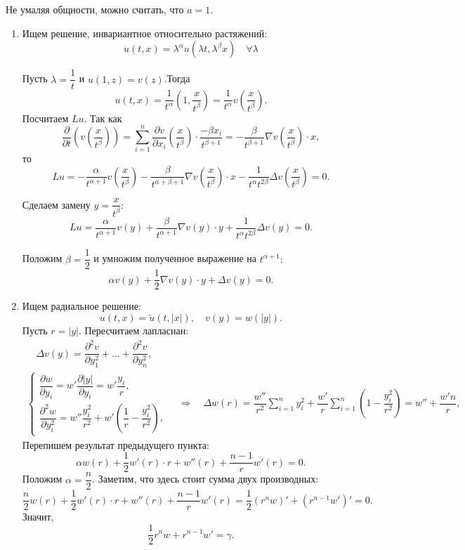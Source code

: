 Не умаляя общности, можно считать, что $a = 1$.

\begin{enumerate}
\item Ищем решение, инвариантное относительно растяжений:
$$u(t,x) = \lambda^\alpha u(\lambda t, \lambda^\beta x) \quad \forall \lambda$$

Пусть $\lambda = \dfrac{1} {t}$ и $u(1, z) = v(z)$.Тогда
$$u(t,x) = \frac{1}{t^\alpha} \left( 1, \frac{x}{t^\beta} \right) = \frac {1} {t^\alpha} v \left( \frac{x}{t^\beta} \right).$$
Посчитаем $Lu$. Так как
$$\frac{\partial}{\partial t} \left(v\left( \frac{x}{t^\beta}\right)\right) = \sum \limits_{i=1}^n \frac{ \partial v}{\partial x_i}\left(\frac{x}{t^\beta}\right) \cdot \frac{-\beta x_i}{t^{\beta + 1}} = -\frac{\beta}{t^{\beta + 1}}\nabla v\left( \frac{x}{t^\beta}\right) \cdot x,$$
то
$$Lu = -\frac{\alpha}{t^{\alpha + 1}} v\left( \dfrac{x}{t^\beta}\right) - \dfrac{\beta}{t^{\alpha + \beta + 1}}\nabla v\left( \dfrac{x}{t^\beta}\right)\cdot x - \dfrac{1}{t^\alpha t^{2\beta}}\Delta v\left( \dfrac{x}{t^\beta}\right) = 0.$$

Сделаем замену $ y = \dfrac{x} {t^\beta}$:
$$Lu =  \dfrac{\alpha}{t^{\alpha + 1}} v(y) + \dfrac{\beta}{t^{\alpha + 1}} \nabla v(y) \cdot y + \dfrac{1}{t^\alpha  t^{2\beta}}\Delta v(y)=0.$$

Положим $\beta = \dfrac{1}{2}$ и умножим полученное выражение на $t^{\alpha + 1}:$
$$\alpha v(y) + \dfrac{1}{2} \nabla v(y) \cdot y + \Delta v(y) = 0.$$

\item Ищем радиальное решение:
$$u(t,x) = \tilde{u}(t,|x|), \quad v(y) = w(|y|).$$
Пусть $r = |y|$. Пересчитаем лапласиан:
\begin{gather*}
	\quad \Delta v(y) = \dfrac{\partial^2v}{\partial y_1^2} + \dots + \dfrac{\partial^2v}{\partial y_n^2}, \\
	\begin{cases*}
		\dfrac{\partial w}{\partial y_i} = w' \dfrac{\partial |y|}{\partial y_i} = w' \dfrac{y_i}{r}, \\
		\dfrac{\partial^2 w}{\partial y_i^2} = w''\dfrac{y_i^2}{r^2} + w'\left(\dfrac{1}{r} - \dfrac{y_i^2}{r^2}\right),
	\end{cases*}
	\quad \Rightarrow \quad
	\Delta w(r) = \dfrac{w''}{r^2}\sum \limits_{i=1}^n y_i^2 + \dfrac{w'}{r}\sum \limits_{i=1}^n (1 - \dfrac{y_i^2}{r^2}) = w'' + \dfrac{w'n}{r},
\end{gather*}
Перепишем результат предыдущего пункта:
$$ \alpha w(r) + \dfrac{1}{2} w'(r) \cdot r + w''(r) + \dfrac{n-1}{r}w'(r) = 0.$$
Положим $\alpha = \dfrac{n}{2}$. Заметим, что здесь стоит сумма двух производных:
$$ \dfrac{n}{2}w(r) + \dfrac{1}{2}w'(r) \cdot r + w''(r) + \dfrac{n-1}{r}w'(r) = \dfrac{1}{2}\left(r^nw\right)' + \left(r^{n-1}w'\right)' = 0.$$
Значит,
$$ \dfrac{1}{2} r^n w+ r^{n-1} w' = \gamma. $$


\end{enumerate}
